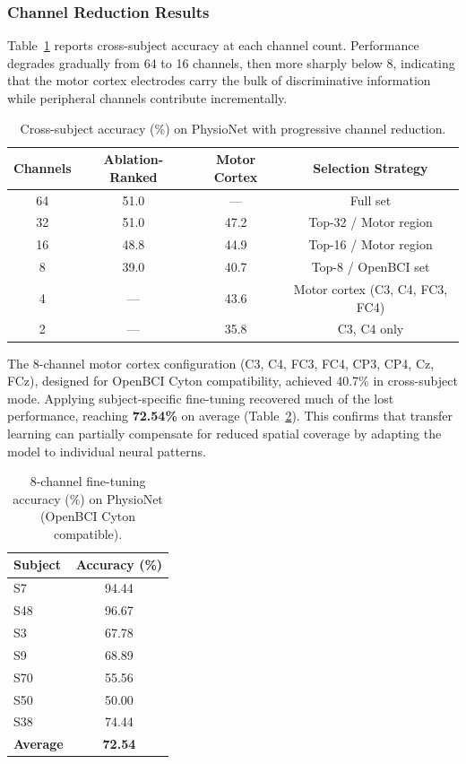 \documentclass[12pt, a4paper]{article}
\begin{document}
\subsubsection{Channel Reduction Results}

Table~\ref{tab:channel_reduction} reports cross-subject accuracy at each channel count. Performance degrades gradually from 64 to 16 channels, then more sharply below 8, indicating that the motor cortex electrodes carry the bulk of discriminative information while peripheral channels contribute incrementally.

\begin{table}[htbp]
\centering
\caption{Cross-subject accuracy (\%) on PhysioNet with progressive channel reduction.}
\label{tab:channel_reduction}
\begin{tabular}{cccc}
\toprule
\textbf{Channels} & \textbf{Ablation-Ranked} & \textbf{Motor Cortex} & \textbf{Selection Strategy} \\
\midrule
64 & 51.0 & --- & Full set \\
32 & 51.0 & 47.2 & Top-32 / Motor region \\
16 & 48.8 & 44.9 & Top-16 / Motor region \\
8  & 39.0 & 40.7 & Top-8 / OpenBCI set \\
4  & --- & 43.6 & Motor cortex (C3, C4, FC3, FC4) \\
2  & --- & 35.8 & C3, C4 only \\
\bottomrule
\end{tabular}
\end{table}

The 8-channel motor cortex configuration (C3, C4, FC3, FC4, CP3, CP4, Cz, FCz), designed for OpenBCI Cyton compatibility, achieved 40.7\% in cross-subject mode. Applying subject-specific fine-tuning recovered much of the lost performance, reaching \textbf{72.54\%} on average (Table~\ref{tab:8ch_finetune}). This confirms that transfer learning can partially compensate for reduced spatial coverage by adapting the model to individual neural patterns.

\begin{table}[htbp]
\centering
\caption{8-channel fine-tuning accuracy (\%) on PhysioNet (OpenBCI Cyton compatible).}
\label{tab:8ch_finetune}
\begin{tabular}{lc}
\toprule
\textbf{Subject} & \textbf{Accuracy (\%)} \\
\midrule
S7  & 94.44 \\
S48 & 96.67 \\
S3  & 67.78 \\
S9  & 68.89 \\
S70 & 55.56 \\
S50 & 50.00 \\
S38 & 74.44 \\
\midrule
\textbf{Average} & \textbf{72.54} \\
\bottomrule
\end{tabular}
\end{table}
\end{document}
